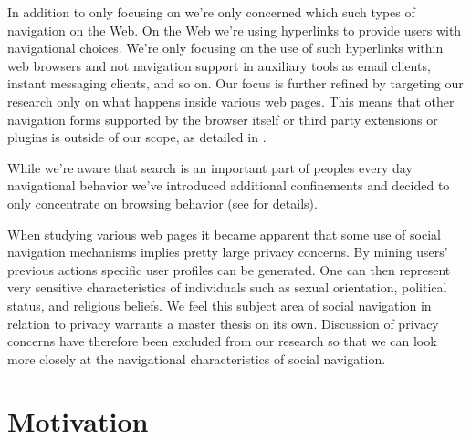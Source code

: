 In addition to only focusing on  we're only concerned
which such types of navigation on the Web.
On the Web we're using hyperlinks \citep[]{nelson65} to provide users
with navigational choices. We're only focusing on the use of such hyperlinks
within web browsers and not navigation support in auxiliary tools as email
clients, instant messaging clients, and so on. Our focus is further refined by
targeting our research  only on what happens inside various web pages. This
means that other navigation forms supported by the browser itself or third
party extensions or plugins is outside of our scope, as detailed in
.

While we're aware that search is an important part of peoples every day
navigational behavior we've introduced additional confinements and decided to
only concentrate on browsing behavior (see
 for details).

When studying various web pages it became apparent that some use of
social navigation mechanisms implies pretty large privacy concerns. By mining
users' previous actions specific user profiles can be generated. One can then
represent very sensitive characteristics of individuals such as sexual
orientation, political status, and religious beliefs.
We feel this subject area of social navigation in relation to privacy warrants
a master thesis on its own. Discussion of privacy concerns have therefore
been excluded from our research so that we can look more closely at the
navigational characteristics of social navigation.

\section{Motivation}


